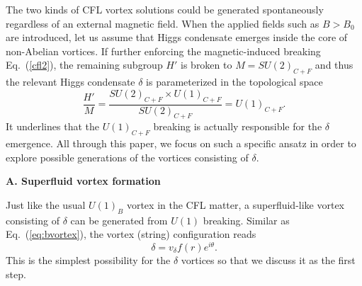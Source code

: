 \documentclass[prd, showpacs,nofootinbib,amsmath,amssymb]{revtex4}
\begin{document}
The two kinds of CFL vortex solutions could be 
generated spontaneously regardless of an external magnetic field.
When the applied fields such as $B > B_0$ are introduced, let us assume that Higgs condensate emerges inside the core of non-Abelian vortices. If further enforcing the magnetic-induced breaking Eq.~(\ref{cfl2}), the remaining subgroup $H'$ is broken to $M =SU(2)_{C+F}$ and thus the relevant Higgs condensate $\delta$ is parameterized in the topological space
\begin{equation}
  \label{eq:mcfsymm}
 \frac{H'}{M} = \frac{SU(2)_{C+F} \times U(1)_{C+F}}{SU(2)_{C+F}} = U(1)_{C+F}.
\end{equation}
It underlines that the $U(1)_{C+F}$ breaking is actually responsible for the $\delta$ emergence.
All through this paper, we focus on such a specific ansatz in order to explore possible generations of the vortices consisting of $\delta$.

\vspace{0.2cm}
\textbf{A. Superfluid vortex formation }
\vspace{0.2cm}

Just like the usual $U(1)_B$ vortex in the CFL matter, a superfluid-like vortex consisting of $\delta$ can be generated from $U(1)$ breaking. Similar as Eq.~(\ref{eq:bvortex}), the vortex (string) configuration reads
\begin{equation}
	\delta= v_\delta f(r) e^{i\theta}.\label{mcflvortex}
\end{equation}
This is the simplest possibility for the $\delta$ vortices so that we discuss it 
as the first step.
\end{document}
